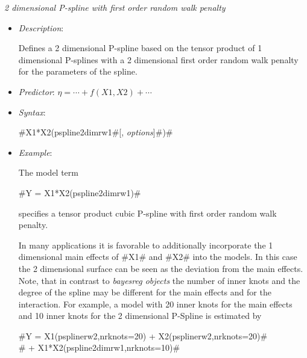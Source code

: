 {\em 2 dimensional P-spline with first order random walk penalty}
\begin{itemize}
\item[] {\em Description}:

Defines a 2 dimensional P-spline based on the tensor product of 1
dimensional P-splines with a 2 dimensional first order random walk
penalty for the parameters of the spline.
\item[] {\em Predictor}: $\eta= \cdots + f(X1,X2) + \cdots$
\item[] {\em Syntax}:

#X1*X2(pspline2dimrw1#[, {\em options}]#)#
\item[] {\em Example}:

The model term

#Y = X1*X2(pspline2dimrw1)#

specifies a tensor product cubic P-spline with first order random
walk penalty.

In many applications it is favorable to additionally incorporate
the 1 dimensional main effects of #X1# and #X2# into the models. In
this case the 2 dimensional surface can be seen as the deviation
from the main effects. Note, that in contrast to {\em bayesreg
objects} the number of inner knots and the degree of the spline
may be different for the main effects and for the interaction. For
example, a model with 20 inner knots for the main effects and 10
inner knots for the 2 dimensional P-Spline is estimated by

 #Y = X1(psplinerw2,nrknots=20) + X2(psplinerw2,nrknots=20)#\\
 #    + X1*X2(pspline2dimrw1,nrknots=10)#
\end{itemize}

